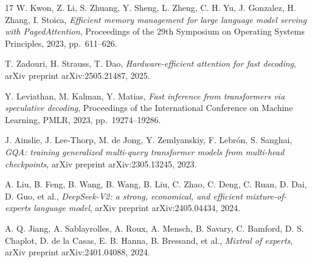 \begin{chapterbibliography}{17}
  W. Kwon, Z. Li, S. Zhuang, Y. Sheng, L. Zheng, C. H. Yu, J. Gonzalez,
  H. Zhang, I. Stoica, \emph{Efficient memory management for large language model serving
  with PagedAttention}, Proceedings of the 29th Symposium on Operating Systems Principles,
  2023, pp.~611--626.

  T. Zadouri, H. Strauss, T. Dao, \emph{Hardware-efficient attention for fast decoding},
  arXiv preprint arXiv:2505.21487, 2025.

  Y. Leviathan, M. Kalman, Y. Matias, \emph{Fast inference from transformers via
  speculative decoding}, Proceedings of the International Conference on Machine Learning,
  PMLR, 2023, pp.~19274--19286.

  J. Ainslie, J. Lee-Thorp, M. de Jong, Y. Zemlyanskiy, F. Lebrón, S. Sanghai,
  \emph{GQA: training generalized multi-query transformer models from multi-head checkpoints},
  arXiv preprint arXiv:2305.13245, 2023.

  A. Liu, B. Feng, B. Wang, B. Wang, B. Liu, C. Zhao, C. Deng, C. Ruan, D. Dai,
  D. Guo, et al., \emph{DeepSeek-V2: a strong, economical, and efficient mixture-of-experts
  language model}, arXiv preprint arXiv:2405.04434, 2024.

  A. Q. Jiang, A. Sablayrolles, A. Roux, A. Mensch, B. Savary, C. Bamford,
  D. S. Chaplot, D. de la Casas, E. B. Hanna, B. Bressand, et al.,
  \emph{Mixtral of experts}, arXiv preprint arXiv:2401.04088, 2024.
\end{chapterbibliography}
